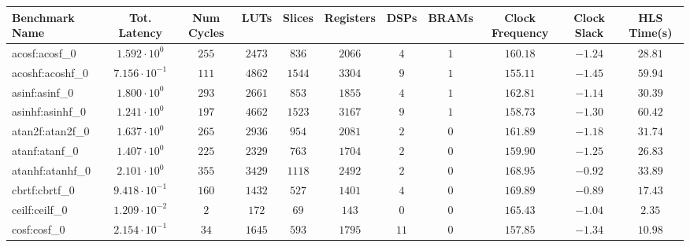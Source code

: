 \begin{tabular}{|l|c|c|c|c|c|c|c|c|c|c|}
\hline
Benchmark Name               & Tot. Latency            & Num Cycles & LUTs      & Slices    & Registers & DSPs    & BRAMs & Clock Frequency & Clock Slack & HLS Time(s) \\
\hline
acosf:acosf\_0               & $ 1.592 \cdot 10^{0}  $ & $ 255    $ & $ 2473  $ & $ 836   $ & $ 2066  $ & $ 4   $ & $ 1 $ & $ 160.18      $ & $ -1.24   $ & $ 28.81   $ \\
acoshf:acoshf\_0             & $ 7.156 \cdot 10^{-1} $ & $ 111    $ & $ 4862  $ & $ 1544  $ & $ 3304  $ & $ 9   $ & $ 1 $ & $ 155.11      $ & $ -1.45   $ & $ 59.94   $ \\
asinf:asinf\_0               & $ 1.800 \cdot 10^{0}  $ & $ 293    $ & $ 2661  $ & $ 853   $ & $ 1855  $ & $ 4   $ & $ 1 $ & $ 162.81      $ & $ -1.14   $ & $ 30.39   $ \\
asinhf:asinhf\_0             & $ 1.241 \cdot 10^{0}  $ & $ 197    $ & $ 4662  $ & $ 1523  $ & $ 3167  $ & $ 9   $ & $ 1 $ & $ 158.73      $ & $ -1.30   $ & $ 60.42   $ \\
atan2f:atan2f\_0             & $ 1.637 \cdot 10^{0}  $ & $ 265    $ & $ 2936  $ & $ 954   $ & $ 2081  $ & $ 2   $ & $ 0 $ & $ 161.89      $ & $ -1.18   $ & $ 31.74   $ \\
atanf:atanf\_0               & $ 1.407 \cdot 10^{0}  $ & $ 225    $ & $ 2329  $ & $ 763   $ & $ 1704  $ & $ 2   $ & $ 0 $ & $ 159.90      $ & $ -1.25   $ & $ 26.83   $ \\
atanhf:atanhf\_0             & $ 2.101 \cdot 10^{0}  $ & $ 355    $ & $ 3429  $ & $ 1118  $ & $ 2492  $ & $ 2   $ & $ 0 $ & $ 168.95      $ & $ -0.92   $ & $ 33.89   $ \\
cbrtf:cbrtf\_0               & $ 9.418 \cdot 10^{-1} $ & $ 160    $ & $ 1432  $ & $ 527   $ & $ 1401  $ & $ 4   $ & $ 0 $ & $ 169.89      $ & $ -0.89   $ & $ 17.43   $ \\
ceilf:ceilf\_0               & $ 1.209 \cdot 10^{-2} $ & $ 2      $ & $ 172   $ & $ 69    $ & $ 143   $ & $ 0   $ & $ 0 $ & $ 165.43      $ & $ -1.04   $ & $ 2.35    $ \\
cosf:cosf\_0                 & $ 2.154 \cdot 10^{-1} $ & $ 34     $ & $ 1645  $ & $ 593   $ & $ 1795  $ & $ 11  $ & $ 0 $ & $ 157.85      $ & $ -1.34   $ & $ 10.98   $ \\

\end{tabular}
